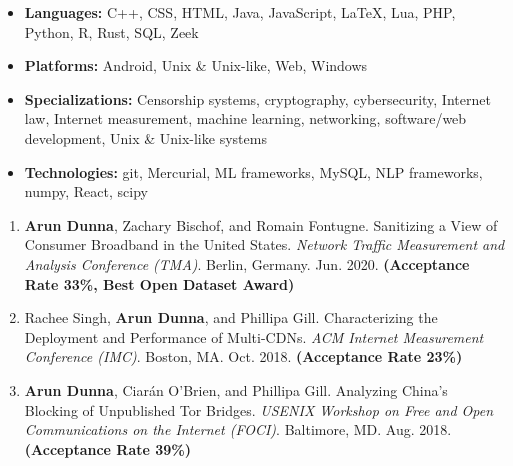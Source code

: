 \newpage


\begin{itemize}
  \item \textbf{Languages:} C++, CSS, HTML, Java, JavaScript, LaTeX, Lua, PHP, Python, R, Rust, SQL, Zeek
  \item \textbf{Platforms:} Android, Unix \& Unix-like, Web, Windows
  \item \textbf{Specializations:} Censorship systems, cryptography, cybersecurity, Internet law, Internet measurement, machine learning, networking, software/web development, Unix \& Unix-like systems
  \item \textbf{Technologies:} git, Mercurial, ML frameworks, MySQL, NLP frameworks, numpy, React, scipy

\end{itemize}


\begin{enumerate}
 \item \textbf{Arun Dunna}, Zachary Bischof, and Romain Fontugne. Sanitizing a View of Consumer Broadband in the United States. \textit{Network Traffic Measurement and Analysis Conference (TMA)}. Berlin, Germany. Jun. 2020. \textbf{(Acceptance Rate 33\%, Best Open Dataset Award)}
 \item Rachee Singh, \textbf{Arun Dunna}, and Phillipa Gill. Characterizing the Deployment and Performance of Multi-CDNs. \textit{ACM Internet Measurement Conference (IMC)}. Boston, MA. Oct. 2018. \textbf{(Acceptance Rate 23\%)}
 \item \textbf{Arun Dunna}, Ciar\'an O'Brien, and Phillipa Gill. Analyzing China's Blocking of Unpublished Tor Bridges. \textit{USENIX Workshop on Free and Open Communications on the Internet (FOCI)}. Baltimore, MD. Aug. 2018. \textbf{(Acceptance Rate 39\%)}
\end{enumerate}


\begin{itemize}
  \setlength{\itemsep}{0pt}
\end{itemize}

